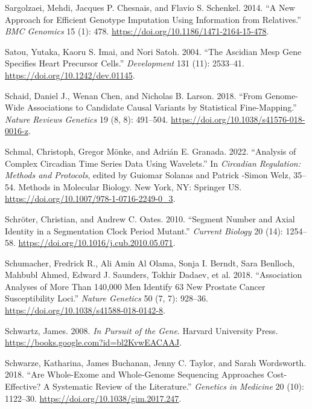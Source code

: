 \documentclass[
]{book}
\newlength{\cslhangindent}
\newlength{\cslentryspacingunit} %
\newenvironment{CSLReferences}[2] %
 {%
  \setlength{\parindent}{0pt}
  \ifodd #1
  \let\oldpar\par
  \def\par{\hangindent=\cslhangindent\oldpar}
  \fi
  \setlength{\parskip}{#2\cslentryspacingunit}
 }%
 {}
\begin{document}
\begin{CSLReferences}{1}{0}
\leavevmode{}%
Sargolzaei, Mehdi, Jacques P. Chesnais, and Flavio S. Schenkel. 2014. {``A New Approach for Efficient Genotype Imputation Using Information from Relatives.''} \emph{BMC Genomics} 15 (1): 478. \url{https://doi.org/10.1186/1471-2164-15-478}.

\leavevmode{}%
Satou, Yutaka, Kaoru S. Imai, and Nori Satoh. 2004. {``The Ascidian {Mesp} Gene Specifies Heart Precursor Cells.''} \emph{Development} 131 (11): 2533--41. \url{https://doi.org/10.1242/dev.01145}.

\leavevmode{}%
Schaid, Daniel J., Wenan Chen, and Nicholas B. Larson. 2018. {``From Genome-Wide Associations to Candidate Causal Variants by Statistical Fine-Mapping.''} \emph{Nature Reviews Genetics} 19 (8, 8): 491--504. \url{https://doi.org/10.1038/s41576-018-0016-z}.

\leavevmode{}%
Schmal, Christoph, Gregor Mönke, and Adrián E. Granada. 2022. {``Analysis of {Complex Circadian Time Series Data Using Wavelets}.''} In \emph{Circadian {Regulation}: {Methods} and {Protocols}}, edited by Guiomar Solanas and Patrick -Simon Welz, 35--54. Methods in {Molecular Biology}. {New York, NY}: {Springer US}. \url{https://doi.org/10.1007/978-1-0716-2249-0_3}.

\leavevmode{}%
Schröter, Christian, and Andrew C. Oates. 2010. {``Segment {Number} and {Axial Identity} in a {Segmentation Clock Period Mutant}.''} \emph{Current Biology} 20 (14): 1254--58. \url{https://doi.org/10.1016/j.cub.2010.05.071}.

\leavevmode{}%
Schumacher, Fredrick R., Ali Amin Al Olama, Sonja I. Berndt, Sara Benlloch, Mahbubl Ahmed, Edward J. Saunders, Tokhir Dadaev, et al. 2018. {``Association Analyses of More Than 140,000 Men Identify 63 New Prostate Cancer Susceptibility Loci.''} \emph{Nature Genetics} 50 (7, 7): 928--36. \url{https://doi.org/10.1038/s41588-018-0142-8}.

\leavevmode{}%
Schwartz, James. 2008. \emph{In {Pursuit} of the {Gene}}. {Harvard University Press}. \url{https://books.google.com?id=bl2KvwEACAAJ}.

\leavevmode{}%
Schwarze, Katharina, James Buchanan, Jenny C. Taylor, and Sarah Wordsworth. 2018. {``Are Whole-Exome and Whole-Genome Sequencing Approaches Cost-Effective? {A} Systematic Review of the Literature.''} \emph{Genetics in Medicine} 20 (10): 1122--30. \url{https://doi.org/10.1038/gim.2017.247}.


\end{CSLReferences}
\end{document}
